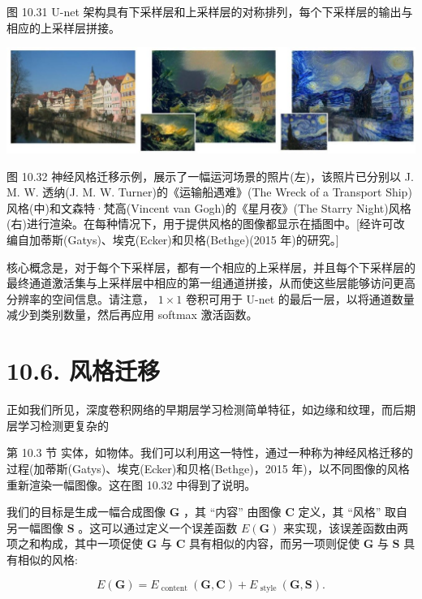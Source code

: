 \documentclass[10pt]{report}
\begin{document}
图 10.31 U-net 架构具有下采样层和上采样层的对称排列，每个下采样层的输出与相应的上采样层拼接。

\begin{center}
\includegraphics[max width=1.0\textwidth]{images/0194e279-9b28-703a-88f4-c3ac21e2010d_339_245_349_1304_340_0.jpg}
\end{center}
\hspace*{3em} 

图 10.32 神经风格迁移示例，展示了一幅运河场景的照片(左)，该照片已分别以 J. M. W. 透纳(J. M. W. Turner)的《运输船遇难》(The Wreck of a Transport Ship)风格(中)和文森特·梵高(Vincent van Gogh)的《星月夜》(The Starry Night)风格(右)进行渲染。在每种情况下，用于提供风格的图像都显示在插图中。[经许可改编自加蒂斯(Gatys)、埃克(Ecker)和贝格(Bethge)(2015 年)的研究。]

核心概念是，对于每个下采样层，都有一个相应的上采样层，并且每个下采样层的最终通道激活集与上采样层中相应的第一组通道拼接，从而使这些层能够访问更高分辨率的空间信息。请注意， \(1 \times  1\) 卷积可用于 U-net 的最后一层，以将通道数量减少到类别数量，然后再应用 softmax 激活函数。

\section*{10.6. 风格迁移}

正如我们所见，深度卷积网络的早期层学习检测简单特征，如边缘和纹理，而后期层学习检测更复杂的

第 10.3 节 实体，如物体。我们可以利用这一特性，通过一种称为神经风格迁移的过程(加蒂斯(Gatys)、埃克(Ecker)和贝格(Bethge)，2015 年)，以不同图像的风格重新渲染一幅图像。这在图 10.32 中得到了说明。

我们的目标是生成一幅合成图像 \(\mathbf{G}\) ，其 “内容” 由图像 \(\mathbf{C}\) 定义，其 “风格” 取自另一幅图像 \(\mathbf{S}\) 。这可以通过定义一个误差函数 \(E\left( \mathbf{G}\right)\) 来实现，该误差函数由两项之和构成，其中一项促使 \(\mathbf{G}\) 与 \(\mathbf{C}\) 具有相似的内容，而另一项则促使 \(\mathbf{G}\) 与 \(\mathbf{S}\) 具有相似的风格:

\[
E\left( \mathbf{G}\right)  = {E}_{\text{ content }}\left( {\mathbf{G},\mathbf{C}}\right)  + {E}_{\text{ style }}\left( {\mathbf{G},\mathbf{S}}\right) . \tag{10.13}
\]
\end{document}
